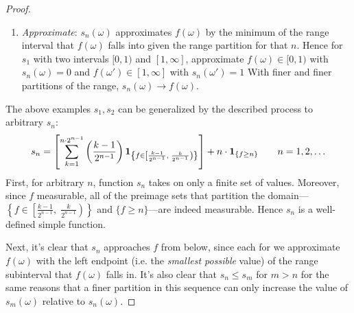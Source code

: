 \documentclass[12pt]{article}
\theoremstyle{plain}
\theoremstyle{definition}
\theoremstyle{remark}
\newcommand{\ra}{\rightarrow}
\newcommand{\one}[1]{\mathbf{1}_{#1}}
\begin{document}
\begin{proof}
\begin{enumerate}[label=(\roman*)]
\begin{itemize}
    \end{itemize}
  \item
    \emph{Approximate}: $s_n(\omega)$ approximates $f(\omega)$ by the
    minimum of the range interval that $f(\omega)$ falls into given the
    range partition for that $n$.
    Hence for $s_1$ with two intervals $[0,1)$ and $[1,\infty]$,
    approximate $f(\omega)\in[0,1)$ with $s_n(\omega)=0$ and
    $f(\omega')\in[1,\infty]$ with $s_n(\omega')=1$
    With finer and finer partitions of the range,
    $s_n(\omega)\ra f(\omega)$.
\end{enumerate}
The above examples $s_1,s_2$ can be generalized by the described process
to arbitrary $s_n$:
\begin{align}
  s_n = \left[
  \sum^{n\cdot 2^{n-1}}_{k=1}
  \left(
  \frac{k-1}{2^{n-1}}
  \right)
  \one{%
    \left\{
      f\in \left[\frac{k-1}{2^{n-1}}, \; \frac{k}{2^{n-1}}\right)
    \right\}
  }
  \right]
  + n \cdot \one{\{f\geq n\}}
  \qquad n=1,2,\ldots
  \label{simpleapprox}
\end{align}
First, for arbitrary $n$, function $s_n$ takes on only a finite set of
values. Moreover, since $f$ measurable, all of the
preimage sets that partition the domain---$\left\{
  f\in \left[\frac{k-1}{2^{n-1}}, \; \frac{k}{2^{n-1}}\right)
\right\}$
and $\{f\geq n\}$---are indeed measurable. Hence $s_n$ is a well-defined
simple function.

Next, it's clear that $s_n$ approaches $f$ from below, since each for we
approximate $f(\omega)$ with the left endpoint (i.e. the
\emph{smallest possible} value) of the range subinterval that
$f(\omega)$ falls in.
It's also clear that
$s_n\leq s_m$ for $m>n$ for the same reasons that a finer partition in
this sequence can only increase the value of $s_m(\omega)$ relative to
$s_n(\omega)$.



\end{proof}
\end{document}

